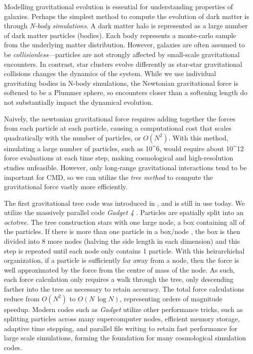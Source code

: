 Modelling gravitational evolution is essential for understanding
properties of galaxies. Perhaps the simplest method to compute the
evolution of dark matter is through \emph{N-body simulations}. A dark
matter halo is represented as a large number of dark matter particles
(bodies). Each body represents a monte-carlo sample from the underlying
matter distribution. However, galaxies are often assumed to be
\emph{collisionless}---particles are not strongly affected by
small-scale gravitational encounters. In contrast, star clusters evolve
differently as star-star gravitational collisions changes the dynamics
of the system. While we use individual gravitating bodies in N-body
simulations, the Newtonian gravitational force is softened to be a
Plummer sphere, so encounters closer than a softening length do not
substantially impact the dynamical evolution.

Naively, the newtonian gravitational force requires adding together the
forces from each particle at each particle, causing a computational cost
that scales quadratically with the number of particles, or \(O(N^2)\).
With this method, simulating a large number of particles, such as
10\^{}6, would require about 10\^{}12 force evaluations at each time
step, making cosmological and high-resolution studies unfeasible.
However, only long-range gravitational interactions tend to be important
for CMD, so we can utilize the \emph{tree method} to compute the
gravitational force vastly more efficiently.

The first gravitational tree code was introduced in
\citet{barnes+hut1986}, and is still in use today. We utilize the
massively parallel code \emph{Gadget 4} \citep{gadget4}. Particles are
spatially split into an \emph{octotree}. The tree construction stars
with one large node, a box containing all of the particles. If there is
more than one particle in a box/node , the box is then divided into 8
more nodes (halving the side length in each dimension) and this step is
repeated until each node only contains 1 particle. With this
heirarchichal organization, if a particle is sufficiently far away from
a node, then the force is well approximated by the force from the centre
of mass of the node. As such, each force calculation only requires a
walk through the tree, only descending farther into the tree as
necessary to retain accuracy. The total force calculations reduce from
\(O(N^2)\) to \(O(N\,\log N)\), representing orders of magnitude
speedup. Modern codes such as \emph{Gadget} utilize other performance
tricks, such as splitting particles across many supercomputer nodes,
efficient memory storage, adaptive time stepping, and parallel file
writing to retain fast performance for large scale simulations, forming
the foundation for many cosmological simulation codes.

